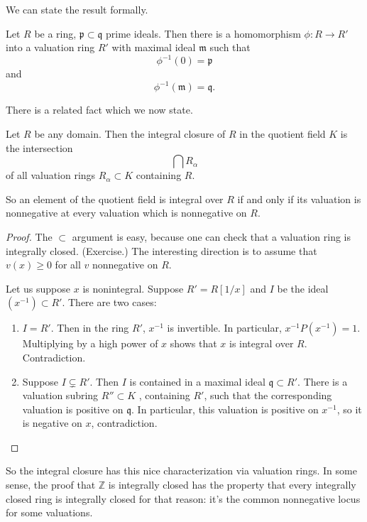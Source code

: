 We can state the result formally.
\begin{theorem} 
Let $R$ be a ring, $\mathfrak{p} \subset \mathfrak{q}$ prime ideals. Then there
is a homomorphism $\phi: R \to R'$ into a valuation ring $R'$ with maximal ideal
$\mathfrak{m}$ such that
\[ \phi^{-1}(0) = \mathfrak{p}  \]
and
\[ \phi^{-1}(\mathfrak{m} ) = \mathfrak{q} .\]
\end{theorem} 

There is a related fact which we now state.
\begin{theorem} 
Let $R$ be any domain. Then the integral closure of $R$ in the quotient field
$K$ is the intersection 
\[ \bigcap R_{\alpha}  \]
of all valuation rings $R_{\alpha} \subset K$ containing $R$.
\end{theorem} 
So an element of the quotient field is integral over $R$ if and only if its
valuation is nonnegative at every valuation which is nonnegative on $R$.

\begin{proof} 
The $\subset$ argument is easy, because one can check that a valuation ring is
integrally closed. (Exercise.)
The interesting direction is to assume that $v(x) \geq 0$ for all $v$ nonnegative
on $R$. 

Let us suppose $x$ is nonintegral. Suppose $R' = R[1/x]$ and $I$ be the ideal
$(x^{-1}) \subset R'$. There are two cases:
\begin{enumerate}
\item $I = R'$. Then in the ring $R'$, $x^{-1} $ is invertible. In particular,
$x^{-1}P(x^{-1}) = 1$. Multiplying by a high power of $x$ shows that $x$ is
integral over $R$.  Contradiction.
\item  Suppose $I \subsetneq R'$. Then $I$ is contained in a maximal ideal
$\mathfrak{q} \subset R'$.  There is a valuation subring $R'' \subset K$ ,
containing $R'$, such that the corresponding valuation is positive on
$\mathfrak{q}$.  In particular, this valuation is positive on $x^{-1}$, so it is
negative on $x$, contradiction. 
\end{enumerate}
\end{proof} 

So the integral closure has this nice characterization via valuation rings. In
some sense, the proof that $\mathbb{Z}$ is integrally closed has the property
that every integrally closed ring is integrally closed for that reason: it's the
common nonnegative locus for some valuations.  

